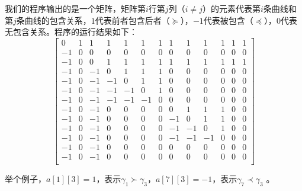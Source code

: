 \documentclass{article}
\begin{document}
	我们的程序输出的是一个矩阵，矩阵第$i$行第$j$列（$i\neq j$）的元素代表第$i$条曲线和第$j$条曲线的包含关系，$1$代表前者包含后者（$\succeq$），$-1$代表被包含（$\preceq$），$0$代表无包含关系。程序的运行结果如下：
	$$
	\left[
	\begin{array}{ccccccccccccc}
		0  & 1 & 1  & 1  & 1  & 1  & 1 & 1  & 1  & 1  & 1 & 1 & 1 \\
		-1 & 0 & 0  & 0  & 0  & 0  & 0 & 0  & 0  & 0  & 0 & 0 & 0 \\
		-1 & 0 & 0  & 1  & 1  & 1  & 1 & 1  & 1  & 1  & 1 & 1 & 1 \\
		-1 & 0 & -1 & 0  & 1  & 1  & 1 & 0  & 0  & 0  & 0 & 0 & 0 \\
		-1 & 0 & -1 & -1 & 0  & 1  & 1 & 0  & 0  & 0  & 0 & 0 & 0 \\
		-1 & 0 & -1 & -1 & -1 & 0  & 1 & 0  & 0  & 0  & 0 & 0 & 0 \\
		-1 & 0 & -1 & -1 & -1 & -1 & 0 & 0  & 0  & 0  & 0 & 0 & 0 \\
		-1 & 0 & -1 & 0  & 0  & 0  & 0 & 0  & 1  & 1  & 1 & 0 & 0 \\
		-1 & 0 & -1 & 0  & 0  & 0  & 0 & -1 & 0  & 1  & 1 & 0 & 0 \\
		-1 & 0 & -1 & 0  & 0  & 0  & 0 & -1 & -1 & 0  & 1 & 0 & 0 \\
		-1 & 0 & -1 & 0  & 0  & 0  & 0 & -1 & -1 & -1 & 0 & 0 & 0 \\
		-1 & 0 & -1 & 0  & 0  & 0  & 0 & 0  & 0  & 0  & 0 & 0 & 0 \\
		-1 & 0 & -1 & 0  & 0  & 0  & 0 & 0  & 0  & 0  & 0 & 0 & 0 \\
	\end{array}	
	\right]
	$$
	
	举个例子，$a[1][3]=1$，表示$\gamma_{1}\succ\gamma_{3}$，$a[7][3]=-1$，表示$\gamma_7\prec\gamma_3$
	。
	
	\newpage
\end{document}
